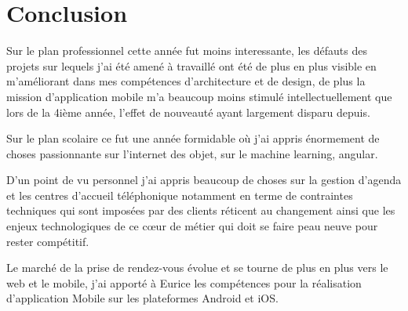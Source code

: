 \chapter*{Conclusion}
Sur le plan professionnel cette année fut moins interessante, les défauts des projets sur lequels
j'ai été amené à travaillé ont été de plus en plus visible en m'améliorant dans 
mes compétences d'architecture et de design, de plus la mission d'application mobile 
m'a beaucoup moins stimulé intellectuellement que lors de la 4ième année, l'effet de nouveauté 
ayant largement disparu depuis.
\newline

Sur le plan scolaire ce fut une année formidable où j'ai appris énormement de choses passionnante 
sur l'internet des objet, sur le machine learning, angular. \newline


D'un point de vu personnel j'ai appris beaucoup de choses sur la gestion d'agenda et les centres d'accueil téléphonique notamment
en terme de contraintes techniques qui sont imposées par des clients réticent au changement 
ainsi que les enjeux technologiques de ce cœur de métier qui doit se faire peau neuve 
pour rester compétitif.

Le marché de la prise de rendez-vous évolue et se tourne de plus en plus vers le 
web et le mobile, j'ai apporté à Eurice les compétences pour la réalisation d'application 
Mobile sur les plateformes Android et iOS.